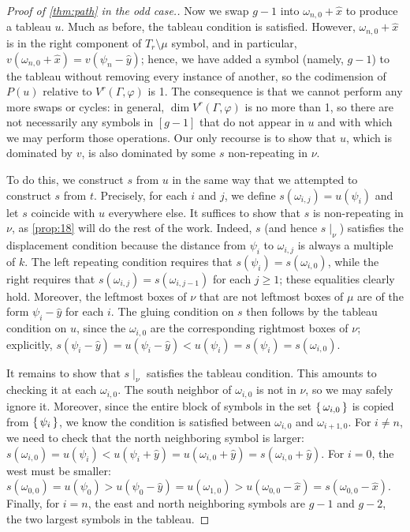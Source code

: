 \documentclass[11pt,reqno]{amsart}
\newcommand*{\restrict}[1]{{\mid}_{#1}}
\theoremstyle{definition}
\theoremstyle{problem}
\theoremstyle{plain}
\theoremstyle{remark}
\theoremstyle{theorem}
\numberwithin{equation}{section}
\numberwithin{figure}{section}
\begin{document}
\begin{proof}[Proof of \cref{thm:path} in the odd case.]
  Now we swap $g-1$ into $\omega_{n,0} + \hat x$ to produce a tableau
  $u$.  Much as before, the tableau condition is satisfied.  However,
  $\omega_{n,0} + \hat x$ is in the right component of
  $T_r \setminus \mu$ symbol, and in particular,
  $v(\omega_{n,0} + \hat x) = v(\psi_n - \hat y)$; hence, we have
  added a symbol (namely, $g-1$) to the tableau without removing every
  instance of another, so the codimension of $P(u)$ relative to
  $V^r(\Gamma,\varphi)$ is 1.  The consequence is that we cannot
  perform any more swaps or cycles: in general,
  $\dim V^r(\Gamma,\varphi)$ is no more than 1, so there are not
  necessarily any symbols in $[g-1]$ that do not appear in $u$ and
  with which we may perform those operations.  Our only recourse is to
  show that $u$, which is dominated by $v$, is also dominated by some
  $s$ non-repeating in $\nu$.

  To do this, we construct $s$ from $u$ in the same way that we
  attempted to construct $s$ from $t$.  Precisely, for each $i$ and
  $j$, we define $s(\omega_{i,j}) = u(\psi_i)$ and let $s$ coincide
  with $u$ everywhere else.  It suffices to show that $s$ is
  non-repeating in $\nu$, as \cref{prop:18} will do the rest of the
  work.  Indeed, $s$ (and hence $s\restrict\nu$) satisfies the
  displacement condition because the distance from $\psi_i$ to
  $\omega_{i,j}$ is always a multiple of $k$.  The left repeating
  condition requires that $s(\psi_i) = s(\omega_{i,0})$, while the
  right requires that $s(\omega_{i,j}) = s(\omega_{i,j-1})$ for each
  $j \geq 1$; these equalities clearly hold.  Moreover, the leftmost
  boxes of $\nu$ that are not leftmost boxes of $\mu$ are of the form
  $\psi_i - \hat{y}$ for each $i$.  The gluing condition on $s$ then
  follows by the tableau condition on $u$, since the $\omega_{i,0}$
  are the corresponding rightmost boxes of $\nu$; explicitly,
  $s(\psi_i - \hat{y}) = u(\psi_i - \hat{y}) < u(\psi_i) = s(\psi_i) =
  s(\omega_{i,0})$.

  It remains to show that $s\restrict{\nu}$ satisfies the tableau
  condition.  This amounts to checking it at each $\omega_{i,0}$.  The
  south neighbor of $\omega_{i,0}$ is not in $\nu$, so we may safely
  ignore it.  Moreover, since the entire block of symbols in the set
  $\set{\omega_{i,0}}$ is copied from $\set{\psi_i}$, we know the
  condition is satisfied between $\omega_{i,0}$ and $\omega_{i+1,0}$.
  For $i \neq n$, we need to check that the north neighboring symbol
  is larger:
  $s(\omega_{i,0}) = u(\psi_i) < u(\psi_i + \hat y) = u(\omega_{i,0} +
  \hat y) = s(\omega_{i,0} + \hat y)$.  For $i = 0$, the west must be
  smaller:
  $s(\omega_{0,0}) = u(\psi_0) > u(\psi_0 - \hat y) = u(\omega_{1,0})
  > u(\omega_{0,0} - \hat x) = s(\omega_{0,0} - \hat x)$.  Finally,
  for $i = n$, the east and north neighboring symbols are $g-1$ and
  $g-2$, the two largest symbols in the tableau.
\end{proof}
\end{document}
